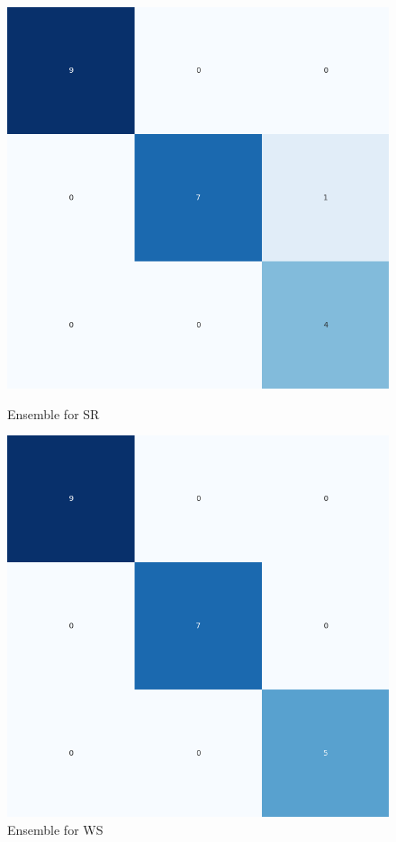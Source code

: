 \begin{figure}[H]
    \centering
    \begin{minipage}[b]{0.45\textwidth}
        \includegraphics[width=\textwidth]{./class_specific_section/ensemble_plots/ensemble_confusion_matrix_SR.png}
        \caption{Ensemble for SR}
        \label{fig_class:spec_ensemble_sr}
    \end{minipage}
    \hfill
    \begin{minipage}[b]{0.45\textwidth}
        \includegraphics[width=\textwidth]{./class_specific_section/ensemble_plots/ensemble_confusion_matrix_WS.png}
        \caption{Ensemble for WS}
        \label{fig_class:spec_ensemble_ws}
    \end{minipage}
\end{figure}

